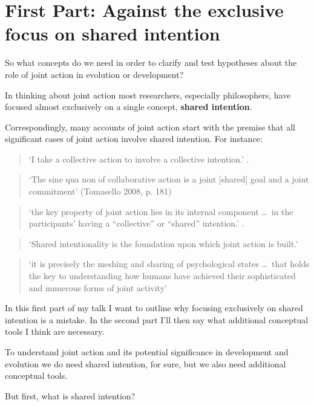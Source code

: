 \documentclass[14pt,a4paper]{extarticle}
\begin{document}
\section{First Part: Against the exclusive focus on shared intention}

So what concepts do we need in order to clarify and test hypotheses about the role of joint action in evolution or development?

In thinking about joint action most researchers, especially philosophers, have focused almost exclusively on a single concept, \textbf{shared intention}.  

Correspondingly, many accounts of joint action start with the premise that all significant cases of joint action involve shared intention.  For instance:  
%
\begin{quote} 
`I take a collective action to involve a collective intention.'  \citep[p.\ 5]{Gilbert:2006wr}.
\end{quote}
%
\begin{quote} 
`The sine qua non of collaborative action is a joint [shared] goal and a joint commitment’ 
(Tomasello 2008, p. 181)
\end{quote} 
%
%
\begin{quote}
`the key property of joint action lies in its internal component \ldots \ in the participants’ having a ``collective'' or ``shared'' intention.' \citep[pp. 444-5]{alonso_shared_2009}.
\end{quote}
%
\begin{quote}
`Shared intentionality is the foundation upon which joint action is built.' \citep[p.\ 381]{Carpenter:2009wq}
\end{quote}
%
\begin{quote}
`it is precisely the meshing and sharing of psychological states \ldots \ that holds the key to understanding how humans have achieved their sophisticated and numerous forms of joint activity'
\citep[p.\ 369]{Call:2009fk}
\end{quote}
%
In this first part of my talk I want to outline why  focusing exclusively on shared intention is a mistake.  
In the second part I'll then say what additional conceptual tools I think are necessary.

To understand joint action and its potential significance in development and evolution we do need shared intention, for sure, but we also need additional conceptual tools.

But first, what is shared intention?
\end{document}
